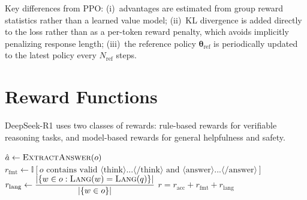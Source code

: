 \documentclass[11pt,a4paper]{article}
\newcommand{\R}{\mathbb{R}}
\newcommand{\params}{\bm{\theta}}
\begin{document}
\medskip

Key differences from PPO: (i)~advantages are estimated from group reward statistics rather than a learned value model; (ii)~KL divergence is added directly to the loss rather than as a per-token reward penalty, which avoids implicitly penalizing response length; (iii)~the reference policy $\params_{\mathrm{ref}}$ is periodically updated to the latest policy every $N_{\mathrm{ref}}$ steps.

\section{Reward Functions}

DeepSeek-R1 uses two classes of rewards: rule-based rewards for verifiable reasoning tasks, and model-based rewards for general helpfulness and safety.

\begin{algorithm}[H]
  \caption{$r \leftarrow \textsc{RuleReward}(q, o, a^* \mid \text{type})$}
  \KwOut{$r \in \R$, scalar reward}
  \BlankLine
  $\hat{a} \leftarrow \textsc{ExtractAnswer}(o)$ 
  \BlankLine
  $r_{\mathrm{fmt}} \leftarrow \mathbb{I}[\text{$o$ contains valid $\langle$think$\rangle$...$\langle$/think$\rangle$ and $\langle$answer$\rangle$...$\langle$/answer$\rangle$}]$ \;
  \BlankLine
  $r_{\mathrm{lang}} \leftarrow \dfrac{|\{w \in o : \textsc{Lang}(w) = \textsc{Lang}(q)\}|}{|\{w \in o\}|}$ 
  \BlankLine
  \Return $r = r_{\mathrm{acc}} + r_{\mathrm{fmt}} + r_{\mathrm{lang}}$
\end{algorithm}
\end{document}
